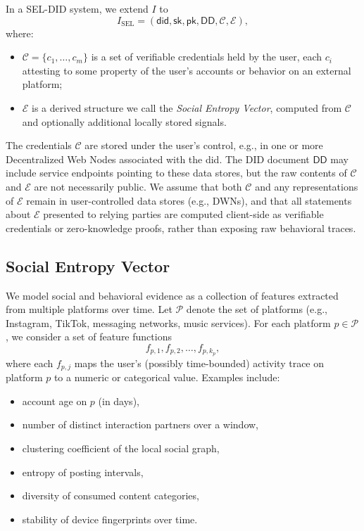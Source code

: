 \documentclass[11pt]{article}
\begin{document}
In a SEL-DID system, we extend $I$ to
\[
  I_{\text{SEL}} = (\mathsf{did}, \mathsf{sk}, \mathsf{pk}, \mathsf{DD}, \mathcal{C}, \mathcal{E}),
\]
where:
\begin{itemize}
  \item $\mathcal{C} = \{c_1, \dots, c_m\}$ is a set of verifiable credentials held by the user, each $c_i$ attesting to some property of the user's accounts or behavior on an external platform;
  \item $\mathcal{E}$ is a derived structure we call the \emph{Social Entropy Vector}, computed from $\mathcal{C}$ and optionally additional locally stored signals.
\end{itemize}

The credentials $\mathcal{C}$ are stored under the user's control, e.g., in one or more Decentralized Web Nodes associated with the \textsf{did}. The DID document $\mathsf{DD}$ may include service endpoints pointing to these data stores, but the raw contents of $\mathcal{C}$ and $\mathcal{E}$ are not necessarily public.
We assume that both $\mathcal{C}$ and any representations of $\mathcal{E}$ remain in user-controlled data stores (e.g., DWNs), and that all statements about $\mathcal{E}$ presented to relying parties are computed client-side as verifiable credentials or zero-knowledge proofs, rather than exposing raw behavioral traces.

\subsection{Social Entropy Vector}

We model social and behavioral evidence as a collection of features extracted from multiple platforms over time. Let $\mathcal{P}$ denote the set of platforms (e.g., Instagram, TikTok, messaging networks, music services). For each platform $p \in \mathcal{P}$, we consider a set of feature functions
\[
  f_{p,1}, f_{p,2}, \dots, f_{p,k_p},
\]
where each $f_{p,j}$ maps the user's (possibly time-bounded) activity trace on platform $p$ to a numeric or categorical value. Examples include:

\begin{itemize}
  \item account age on $p$ (in days),
  \item number of distinct interaction partners over a window,
  \item clustering coefficient of the local social graph,
  \item entropy of posting intervals,
  \item diversity of consumed content categories,
  \item stability of device fingerprints over time.
\end{itemize}
\end{document}
